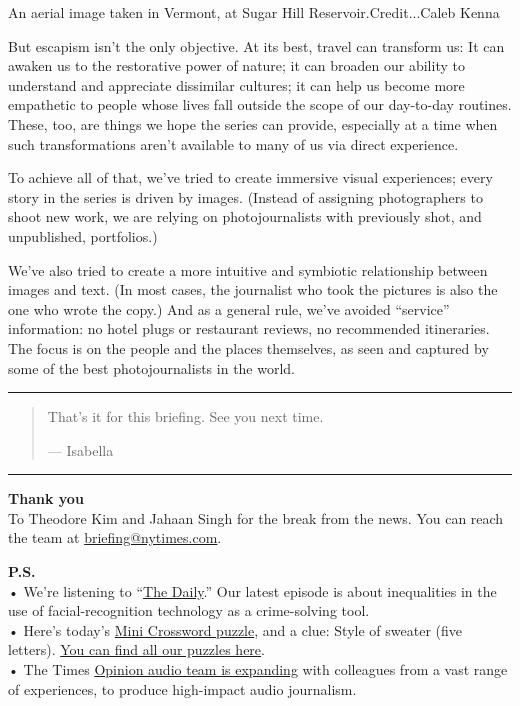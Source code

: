 An aerial image taken in Vermont, at Sugar Hill Reservoir.Credit...Caleb
Kenna

But escapism isn't the only objective. At its best, travel can transform
us: It can awaken us to the restorative power of nature; it can broaden
our ability to understand and appreciate dissimilar cultures; it can
help us become more empathetic to people whose lives fall outside the
scope of our day-to-day routines. These, too, are things we hope the
series can provide, especially at a time when such transformations
aren't available to many of us via direct experience.

To achieve all of that, we've tried to create immersive visual
experiences; every story in the series is driven by images. (Instead of
assigning photographers to shoot new work, we are relying on
photojournalists with previously shot, and unpublished, portfolios.)

We've also tried to create a more intuitive and symbiotic relationship
between images and text. (In most cases, the journalist who took the
pictures is also the one who wrote the copy.) And as a general rule,
we've avoided ``service'' information: no hotel plugs or restaurant
reviews, no recommended itineraries. The focus is on the people and the
places themselves, as seen and captured by some of the best
photojournalists in the world.

\begin{center}\rule{0.5\linewidth}{\linethickness}\end{center}

\begin{quote}
That's it for this briefing. See you next time.

--- Isabella
\end{quote}

\begin{center}\rule{0.5\linewidth}{\linethickness}\end{center}

\textbf{Thank you}\\
To Theodore Kim and Jahaan Singh for the break from the news. You can
reach the team at
\href{mailto:briefing+midnight@nytimes.com?subject=Briefing\%20Feedback}{briefing@nytimes.com}.

\textbf{P.S.}\\
• We're listening to ``\href{https://www.nytimes.com/thedaily}{The
Daily}.'' Our latest episode is about inequalities in the use of
facial-recognition technology as a crime-solving tool.\\
• Here's today's
\href{https://www.nytimes.com/crosswords/game/mini}{Mini Crossword
puzzle}, and a clue: Style of sweater (five letters).
\href{https://www.nytimes.com/crosswords}{You can find all our puzzles
here}.\\
• The Times
\href{https://www.nytco.com/press/introducing-the-opinion-audio-team/}{Opinion
audio team is expanding} with colleagues from a vast range of
experiences, to produce high-impact audio journalism.

